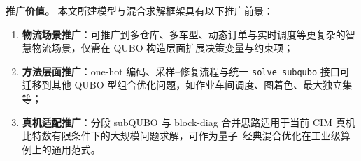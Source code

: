 \documentclass[UTF8,12pt,a4paper]{ctexart}
\begin{document}
\textbf{推广价值。} 本文所建模型与混合求解框架具有以下推广前景：

\begin{enumerate}[label=(\arabic*),leftmargin=*]
    \item \textbf{物流场景推广}：可推广到多仓库、多车型、动态订单与实时调度等更复杂的智慧物流场景，仅需在 QUBO 构造层面扩展决策变量与约束项；
    \item \textbf{方法层面推广}：one-hot 编码、采样--修复流程与统一 \texttt{solve\_subqubo} 接口可迁移到其他 QUBO 型组合优化问题，如作业车间调度、图着色、最大独立集等；
    \item \textbf{真机适配推广}：分段 subQUBO 与 block-diag 合并思路适用于当前 CIM 真机比特数有限条件下的大规模问题求解，可作为量子--经典混合优化在工业级算例上的通用范式。
\end{enumerate}
\end{document}
